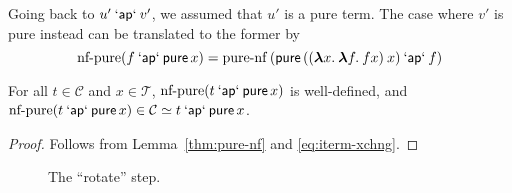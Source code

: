 Going back to $u' \mathbin{\mathsf{`ap`}} v'$, we assumed that $u'$ is a pure term.
The case where $v'$ is pure instead can be translated to the former by
\begin{equation}
	\operatorname{nf-pure}(f \mathbin{\mathsf{`ap`}} \operatorname{\mathsf{pure}} x) =
		\operatorname{pure-nf}{(\operatorname{\mathsf{pure}}{(({\boldsymbol\lambda} x.\>{\boldsymbol\lambda} f.\>f x) \> x)} \mathbin{\mathsf{`ap`}} f)} \\
\end{equation}
\begin{lemma}\label{thm:nf-pure}
For all $t \in \mathcal{C}$ and $x \in \mathcal{T}$,
$\operatorname{nf-pure}(t \mathbin{\mathsf{`ap`}} \operatorname{\mathsf{pure}} x)$ is well-defined, and
$\operatorname{nf-pure}(t \mathbin{\mathsf{`ap`}} \operatorname{\mathsf{pure}} x) \in \mathcal{C} \simeq t \mathbin{\mathsf{`ap`}} \operatorname{\mathsf{pure}} x$.
\end{lemma}
\begin{proof}
Follows from Lemma~\ref{thm:pure-nf} and \eqref{eq:iterm-xchng}.
\end{proof}

\begin{figure}\centering
{}
\raisebox{10mm}{$\qquad\simeq\qquad$}
\caption{The ``rotate'' step.}
\label{fig:rotate}
\end{figure}

